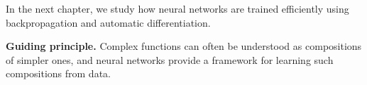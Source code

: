\medskip

In the next chapter, we study how neural networks are trained efficiently using backpropagation and automatic differentiation.

\medskip

\noindent
\textbf{Guiding principle.}  
Complex functions can often be understood as compositions of simpler ones, and neural networks provide a framework for learning such compositions from data.